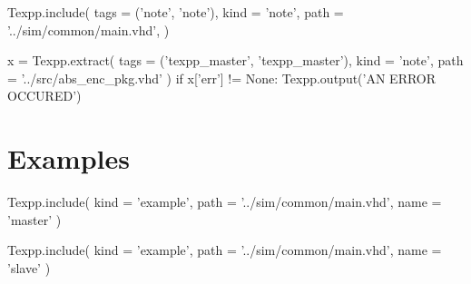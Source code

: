 \documentclass[12pt]{article}
\begin{document}
\begin{texpp}
Texpp.include(
 tags = ('note', 'note'),
 kind = 'note',
 path = '../sim/common/main.vhd',
)
\end{texpp}

\begin{texpp}
x = Texpp.extract(
 tags = ('texpp_master', 'texpp_master'),
 kind = 'note',
 path = '../src/abs_enc_pkg.vhd'
)
if x['err'] != None: Texpp.output('AN ERROR OCCURED')
\end{texpp}


\newpage
\section{Examples}

\begin{texpp}
Texpp.include(
 kind = 'example',
 path = '../sim/common/main.vhd',
 name = 'master'
)
\end{texpp}

\begin{texpp}
Texpp.include(
 kind = 'example',
 path = '../sim/common/main.vhd',
 name = 'slave'
)
\end{texpp}
\end{document}

